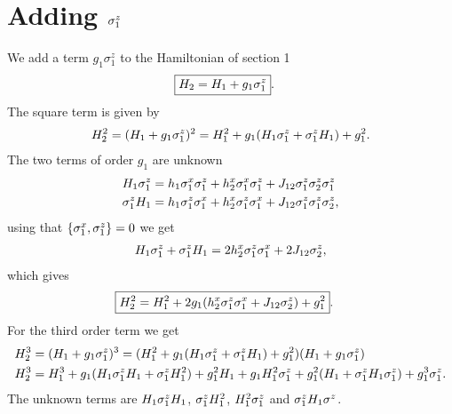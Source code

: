 \section{Adding $\sigma^{z}_1$}

We add a term $g_1 \sigma^z_1$ to the Hamiltonian of section 1
\begin{align*}
    \Aboxed{H_2 &=  {H_1} + g_1 {\sz_1}}.
\end{align*}
The square term is given by
\begin{align*}
    H_2^2 =  ({H_1} + g_1 {\sigma^{z}_1})^2 = H_1^2 + g_1(H_1 {\sigma^{z}_1} +  {\sigma^{z}_1} H_1)+ g_1^2.
\end{align*}
The two terms of order $g_1$ are unknown
\begin{align*}
    H_1 {\sigma^{z}_1} &= h_1 {\sigma^{x}_1} {\sigma^{z}_1} + h^x_2 {\sigma^{x}_1} {\sigma^{z}_1} + J_{12} {\sigma^{z}_1} {\sigma^{z}_2} {\sigma^{z}_1}\\
    {\sigma^{z}_1} H_1 &= h_1 {\sigma^{z}_1}{\sigma^{x}_1}  + h^x_2 {\sigma^{z}_1} {\sigma^{x}_1}  + J_{12} {\sigma^{z}_1} {\sigma^{z}_1} {\sigma^{z}_2},
\end{align*}
using that $\acomm{{\sx_1}}{{\sz_1}}=0$ we get
\begin{align*}
    H_1 \sigma^z_1 +  {\sigma^{z}_1} H_1 =  2h^x_2 {\sigma^{z}_1} {\sigma^{x}_1}  + 2J_{12}{\sigma^{z}_2},
\end{align*}
which gives
\begin{align*}
    \Aboxed{H_2^2 &=  H_1^2 + 2 g_1(h^x_2 {\sz_1} {\sx_1}  + J_{12}{\sz_2})+ g_1^2}.
\end{align*}
For the third order term we get
\begin{align}
    H_2^3 &=  ({H_1} + g_1 {\sigma^{z}_1})^3 = (H_1^2 + g_1(H_1 {\sigma^{z}_1} +  {\sigma^{z}_1} H_1)+ g_1^2 )({H_1} + g_1 {\sigma^{z}_1})\nonumber\\
    H_2^3 &=  H_1^3 + g_1(H_1 {\sigma^{z}_1}H_1 +  {\sigma^{z}_1} H_1^2) + g_1^2 H_1 + g_1 H_1^2 {\sigma^{z}_1} + g_1^2 (H_1 +  {\sigma^{z}_1} H_1{\sigma^{z}_1}) + g_1^3{\sigma^{z}_1} \label{eq:h2_3rd}.
\end{align}
The unknown terms are $H_1 {\sigma^{z}_1}H_1$, ${\sigma^{z}_1} H_1^2$, $H_1^2 {\sigma^{z}_1}$ and ${\sigma^{z}_1} H_1\sigma^{z}$.
